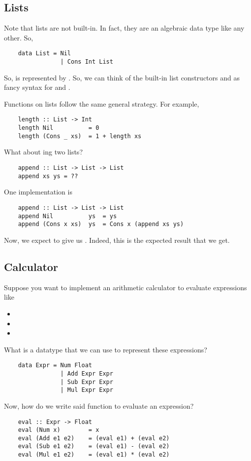 \documentclass[letterpaper]{article}
\begin{document}
\subsection{Lists}
Note that lists are not built-in. In fact, they are an algebraic data type like any other. So,
\begin{verbatim}
    data List = Nil 
                | Cons Int List 
\end{verbatim}
So, \code{[1, 2, 3]} is represented by . So, we can think of the built-in list constructors \code{[]} and \code{(:)} as fancy syntax for  and .

\bigskip 

Functions on lists follow the same general strategy. For example, 
\begin{verbatim}
    length :: List -> Int 
    length Nil          = 0
    length (Cons _ xs)  = 1 + length xs \end{verbatim}

What about ing two lists? 
\begin{verbatim}
    append :: List -> List -> List 
    append xs ys = ??\end{verbatim}
One implementation is 
\begin{verbatim}
    append :: List -> List -> List 
    append Nil          ys  = ys 
    append (Cons x xs)  ys  = Cons x (append xs ys)\end{verbatim}
Now, we expect  to give us \code{[1, 2, 3, 4]}. Indeed, this is the expected result that we get.

\subsection{Calculator}
Suppose you want to implement an arithmetic calculator to evaluate expressions like 
\begin{itemize}
    \item {}
    \item {}
    \item {}
\end{itemize}
What is a datatype that we can use to represent these expressions? 
\begin{verbatim}
    data Expr = Num Float 
                | Add Expr Expr 
                | Sub Expr Expr 
                | Mul Expr Expr\end{verbatim}

Now, how do we write said function to evaluate an expression?
\begin{verbatim}
    eval :: Expr -> Float 
    eval (Num x)        = x
    eval (Add e1 e2)    = (eval e1) + (eval e2)
    eval (Sub e1 e2)    = (eval e1) - (eval e2)
    eval (Mul e1 e2)    = (eval e1) * (eval e2)
\end{verbatim}
\end{document}
